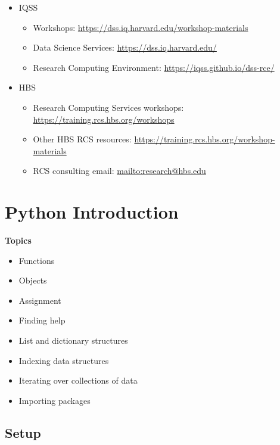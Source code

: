 \documentclass[]{book}
\providecommand{\tightlist}{%
  \setlength{\itemsep}{0pt}\setlength{\parskip}{0pt}}
\begin{document}
\begin{itemize}
\tightlist
\item
  IQSS

  \begin{itemize}
  \tightlist
  \item
    Workshops: \url{https://dss.iq.harvard.edu/workshop-materials}
  \item
    Data Science Services: \url{https://dss.iq.harvard.edu/}
  \item
    Research Computing Environment: \url{https://iqss.github.io/dss-rce/}
  \end{itemize}
\item
  HBS

  \begin{itemize}
  \tightlist
  \item
    Research Computing Services workshops: \url{https://training.rcs.hbs.org/workshops}
  \item
    Other HBS RCS resources: \url{https://training.rcs.hbs.org/workshop-materials}
  \item
    RCS consulting email: \url{mailto:research@hbs.edu}
  \end{itemize}
\end{itemize}

\hypertarget{python-introduction}{%
\chapter{Python Introduction}\label{python-introduction}}

\textbf{Topics}

\begin{itemize}
\tightlist
\item
  Functions
\item
  Objects
\item
  Assignment
\item
  Finding help
\item
  List and dictionary structures
\item
  Indexing data structures
\item
  Iterating over collections of data
\item
  Importing packages
\end{itemize}

\hypertarget{setup-4}{%
\section{Setup}\label{setup-4}}
\end{document}
